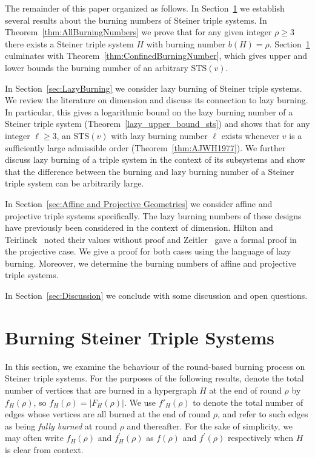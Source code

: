 \documentclass[12pt]{article}
\theoremstyle{definition}
\numberwithin{table}{section}
\newcommand{\round}{{\rho}}
\begin{document}
The remainder of this paper organized as follows.
In Section~\ref{sec:burnSTS} we establish several results about the burning numbers of Steiner triple systems.
In Theorem~\ref{thm:AllBurningNumbers} we prove that for any given integer $\round \geq 3$ there exists a Steiner triple system $H$ with burning number $b(H) = \round$.
Section~\ref{sec:burnSTS} culminates with Theorem~\ref{thm:ConfinedBurningNumber}, which gives upper and lower bounds the burning number of an arbitrary STS$(v)$.

In Section~\ref{sec:LazyBurning} we consider lazy burning of Steiner triple systems. We review the literature on dimension and discuss its connection to lazy burning. In particular, this gives a logarithmic bound on the lazy burning number of a Steiner triple system (Theorem~\ref{lazy_upper_bound_sts}) and shows that for any integer $\ell \geq 3$, an STS$(v)$ with lazy burning number $\ell$ exists whenever $v$ is a sufficiently large admissible order (Theorem~\ref{thm:AJWH1977}).  We further discuss lazy burning of a triple system in the context of its subsystems and show that the difference between the burning and lazy burning number of a Steiner triple system can be arbitrarily large.

In Section~\ref{sec:Affine and Projective Geometries} we consider affine and projective triple systems specifically. The lazy burning numbers of these designs have previously been considered in the context of dimension.  Hilton and Teirlinck~\cite{HiltonTeirlinck1980} noted their values without proof and Zeitler~\cite{Zeitler1987} gave a formal proof in the projective case.  We give a proof for both cases using the language of lazy burning.  Moreover, we determine the burning numbers of affine and projective triple systems.

In Section~\ref{sec:Discussion} we conclude with some discussion and open questions.


\section{Burning Steiner Triple Systems}
\label{sec:burnSTS}

In this section, we examine the behaviour of the round-based burning process on Steiner triple systems.  For the purposes of the following results, denote the total number of vertices that are burned in a hypergraph $H$ at the end of round $\round$ by $f_H(\round)$, so $f_H(\round) = |F_H(\round)|$.   
We use $f'_H(\round)$ to denote the total number of edges whose vertices are all burned at the end of round $\round$, and refer to such edges as being {\em fully burned} at round $\round$ and thereafter.  
For the sake of simplicity, we may often write $f_H(\round)$ and $f^\prime_H(\round)$ as $f(\round)$ and $f^\prime(\round)$ 
respectively when $H$ is clear from context. 
\end{document}
